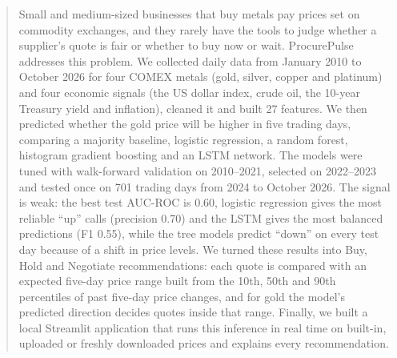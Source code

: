 \begin{abstract}
Small and medium-sized businesses that buy metals pay prices set on commodity
exchanges, and they rarely have the tools to judge whether a supplier's quote
is fair or whether to buy now or wait. ProcurePulse addresses this problem. We
collected daily data from January 2010 to October 2026 for four COMEX metals
(gold, silver, copper and platinum) and four economic signals (the US dollar
index, crude oil, the 10-year Treasury yield and inflation), cleaned it and
built 27 features. We then predicted whether the gold price will be higher in
five trading days, comparing a majority baseline, logistic regression, a
random forest, histogram gradient boosting and an LSTM network. The models
were tuned with walk-forward validation on 2010--2021, selected on 2022--2023
and tested once on 701 trading days from 2024 to October 2026. The signal is
weak: the best test AUC-ROC is 0.60, logistic regression gives the most
reliable ``up'' calls (precision 0.70) and the LSTM gives the most balanced
predictions (F1 0.55), while the tree models predict ``down'' on every test
day because of a shift in price levels. We turned these results into
Buy, Hold and Negotiate recommendations: each quote is compared with an
expected five-day price range built from the 10th, 50th and 90th percentiles
of past five-day price changes, and for gold the model's predicted direction
decides quotes inside that range. Finally, we built a local Streamlit
application that runs this inference in real time on built-in, uploaded or
freshly downloaded prices and explains every recommendation.
\end{abstract}
